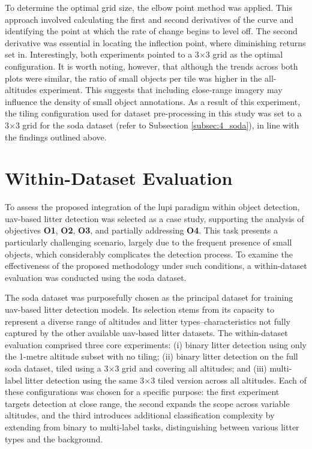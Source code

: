 To determine the optimal grid size, the elbow point \cite{elbow_point} method was applied. This approach involved calculating the first and second derivatives of the curve and identifying the point at which the rate of change begins to level off. The second derivative was essential in locating the inflection point, where diminishing returns set in.
Interestingly, both experiments pointed to a 3$\times$3 grid as the optimal configuration. It is worth noting, however, that although the trends across both plots were similar, the ratio of small objects per tile was higher in the all-altitudes experiment. This suggests that including close-range imagery may influence the density of small object annotations.
As a result of this experiment, the tiling configuration used for dataset pre-processing in this study was set to a 3$\times$3 grid for the \gls{soda} dataset (refer to Subsection \ref{subsec:4_soda}), in line with the findings outlined above.

\section{Within-Dataset Evaluation}
\label{sec:5_within_dataset_exp}


To assess the proposed integration of the \gls{lupi} paradigm within object detection, \gls{uav}-based litter detection was selected as a case study, supporting the analysis of objectives \textbf{O1}, \textbf{O2}, \textbf{O3}, and partially addressing \textbf{O4}. This task presents a particularly challenging scenario, largely due to the frequent presence of small objects, which considerably complicates the detection process. To examine the effectiveness of the proposed methodology under such conditions, a within-dataset evaluation was conducted using the \gls{soda} dataset.

The \gls{soda} dataset was purposefully chosen as the principal dataset for training \gls{uav}-based litter detection models. Its selection stems from its capacity to represent a diverse range of altitudes and litter types--characteristics not fully captured by the other available \gls{uav}-based litter datasets. The within-dataset evaluation comprised three core experiments: (i) binary litter detection using only the 1-metre altitude subset with no tiling; (ii) binary litter detection on the full \gls{soda} dataset, tiled using a 3$\times$3 grid and covering all altitudes; and (iii) multi-label litter detection using the same 3$\times$3 tiled version across all altitudes. Each of these configurations was chosen for a specific purpose: the first experiment targets detection at close range, the second expands the scope across variable altitudes, and the third introduces additional classification complexity by extending from binary to multi-label tasks, distinguishing between various litter types and the background.

